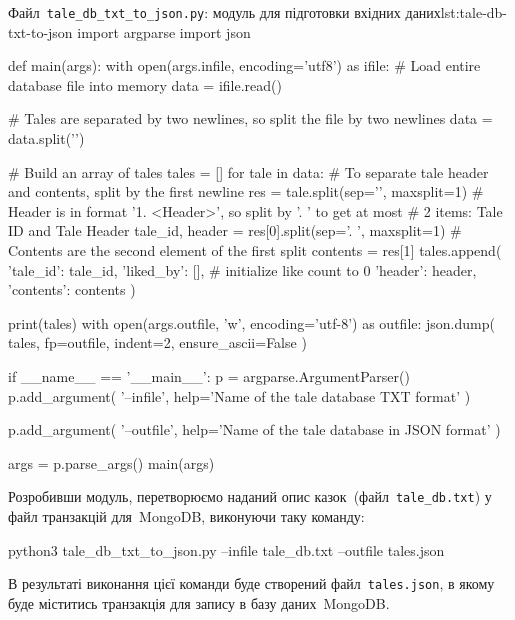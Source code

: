 \documentclass[
	a4paper,
	oneside,
	BCOR = 10mm,
	DIV = 12,
	12pt,
	headings = normal,
]{scrartcl}
\newcommand{\filename}[1]{\texttt{#1}}
\begin{document}
				\begin{listingpython}{Файл~\filename{\textenglish{tale\_db\_txt\_to\_json.py}}: модуль для підготовки вхідних даних}{lst:tale-db-txt-to-json}
import argparse
import json


def main(args):
    with open(args.infile, encoding='utf8') as ifile:
        # Load entire database file into memory
        data = ifile.read()

    # Tales are separated by two newlines, so split the file by two newlines
    data = data.split('\n\n')

    # Build an array of tales
    tales = []
    for tale in data:
        # To separate tale header and contents, split by the first newline
        res = tale.split(sep='\n', maxsplit=1)
        # Header is in format '1. <Header>', so split by '. ' to get at most
        # 2 items: Tale ID and Tale Header
        tale_id, header = res[0].split(sep='. ', maxsplit=1)
        # Contents are the second element of the first split
        contents = res[1]
        tales.append(
            {
                'tale_id': tale_id,
                'liked_by': [],  # initialize like count to 0
                'header': header,
                'contents': contents
            }
        )

    print(tales)
    with open(args.outfile, 'w', encoding='utf-8') as outfile:
        json.dump(
            tales,
            fp=outfile,
            indent=2,
            ensure_ascii=False
        )


if __name__ == '__main__':
    p = argparse.ArgumentParser()
    p.add_argument(
        '--infile',
        help='Name of the tale database TXT format'
    )

    p.add_argument(
        '--outfile',
        help='Name of the tale database in JSON format'
    )

    args = p.parse_args()
    main(args)
				\end{listingpython}

				Розробивши модуль, перетворюємо наданий опис казок~(файл~\filename{tale\_db.txt}) у файл транзакцій для~\textenglish{MongoDB}, виконуючи таку команду:
				\begin{bashterm}
					python3 tale_db_txt_to_json.py --infile tale_db.txt --outfile tales.json
				\end{bashterm}
				В результаті виконання цієї команди буде створений файл~\filename{\textenglish{tales.json}}, в якому буде міститись транзакція для запису в базу даних~\textenglish{MongoDB}.
\end{document}
